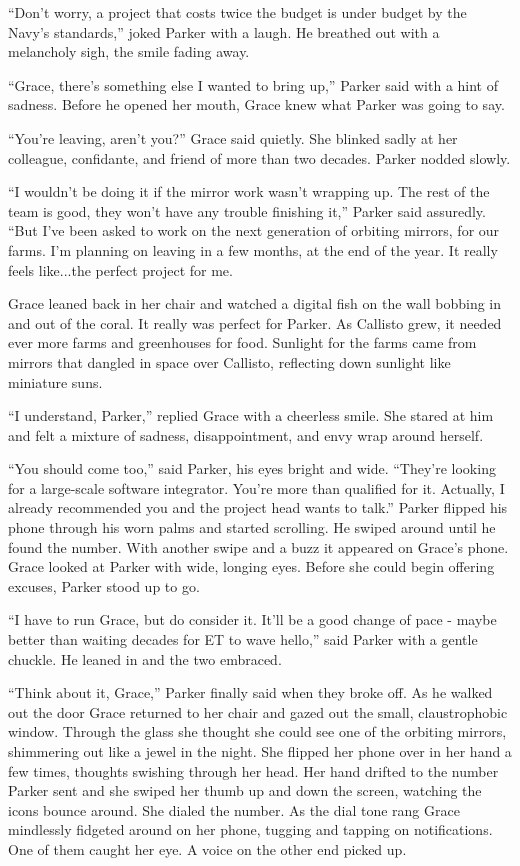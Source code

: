 \documentclass[12pt]{article} %
\begin{document}
``Don't worry, a project that costs twice the budget is under budget by the Navy's standards,'' joked Parker with a laugh. He breathed out with a melancholy sigh, the smile fading away.

``Grace, there's something else I wanted to bring up,'' Parker said with a hint of sadness. Before he opened her mouth, Grace knew what Parker was going to say.

``You're leaving, aren't you?'' Grace said quietly. She blinked sadly at her colleague, confidante, and friend of more than two decades. Parker nodded slowly.

``I wouldn't be doing it if the mirror work wasn't wrapping up. The rest of the team is good, they won't have any trouble finishing it,'' Parker said assuredly. ``But I've been asked to work on the next generation of orbiting mirrors, for our farms. I'm planning on leaving in a few months, at the end of the year. It really feels like...the perfect project for me.

Grace leaned back in her chair and watched a digital fish on the wall bobbing in and out of the coral. It really was perfect for Parker. As Callisto grew, it needed ever more farms and greenhouses for food. Sunlight for the farms came from mirrors that dangled in space over Callisto, reflecting down sunlight like miniature suns.

``I understand, Parker,'' replied Grace with a cheerless smile. She stared at him and felt a mixture of sadness, disappointment, and envy wrap around herself.

``You should come too,'' said Parker, his eyes bright and wide. ``They're looking for a large-scale software integrator. You're more than qualified for it. Actually, I already recommended you and the project head wants to talk.'' Parker flipped his phone through his worn palms and started scrolling. He swiped around until he found the number. With another swipe and a buzz it appeared on Grace's phone. Grace looked at Parker with wide, longing eyes. Before she could begin offering excuses, Parker stood up to go.

``I have to run Grace, but do consider it. It'll be a good change of pace - maybe better than waiting decades for ET to wave hello,'' said Parker with a gentle chuckle. He leaned in and the two embraced.

``Think about it, Grace,'' Parker finally said when they broke off. As he walked out the door Grace returned to her chair and gazed out the small, claustrophobic window. Through the glass she thought she could see one of the orbiting mirrors, shimmering out like a jewel in the night. She flipped her phone over in her hand a few times, thoughts swishing through her head. Her hand drifted to the number Parker sent and she swiped her thumb up and down the screen, watching the icons bounce around. She dialed the number. As the dial tone rang Grace mindlessly fidgeted around on her phone, tugging and tapping on notifications. One of them caught her eye. A voice on the other end picked up.
\end{document}
